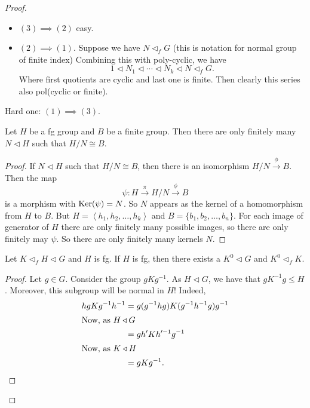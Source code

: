 \begin{proof}
    \begin{itemize}
        \item $(3) \implies (2)$ easy.

        \item $(2) \implies (1)$.
            Suppose we have $N \triangleleft_f G$ (this is notation for normal group of finite index)
            Combining this with poly-cyclic, we have
            \[
            1 \triangleleft N_1 \triangleleft \cdots \triangleleft N_k \triangleleft N \triangleleft_f G
            .\] 
            Where first quotients are cyclic and last one is finite.
            Then clearly this series also pol(cyclic or finite).
    \end{itemize}

    Hard one: $(1) \implies (3)$.
    \begin{lemma}
        Let $H$ be a fg group and $B$ be a finite group.
        Then there are only finitely many $N \triangleleft H$ such that $H / N \cong B$.
    \end{lemma}
    \begin{proof}
        If $N\triangleleft H$ such that $H / N \cong B$, then there is an isomorphism  $H / N \xrightarrow{\phi} B$.
        Then the map
        \[
        \psi: H \xrightarrow{\pi}   H / N \xrightarrow{\phi} B
        \] 
        is a morphism with $\operatorname{Ker}(\psi) = N$.
        So $N$ appears as the kernel of a homomorphism from $H$ to $B$.
        But $ H = \left< h_1, h_2, \ldots, h_k\right>$ and $B = \{b_1, b_2, \ldots, b_n\}$.
        For each image of generator of $H$ there are only finitely many possible images, so there are only finitely may $\psi$.
        So there are only finitely many kernels $N$.
    \end{proof}
    \begin{lemma}
        Let $K \triangleleft_f H \triangleleft G$ and $H$ is fg.
        If $H$ is fg, then there exists a  $ K^0 \triangleleft G$ and $K^0 \triangleleft_f K$.
    \end{lemma}
    \begin{proof}
        Let $g \in G.$
        Consider the group $g K g^{-1}$.
        As $H \triangleleft G$, we have that $g K^{-1} g \le  H$.
        Moreover, this subgroup will be normal in $H$!
        Indeed, 
        \begin{align*}
            h g K g^{-1} h^{-1} &= g(g^{-1} h g) K (g^{-1} h^{-1} g) g^{-1}\\
            \shortintertext{Now, as $H \triangleleft G$}
                                &= g h' K h'^{-1}  g^{-1}\\
        \shortintertext{Now, as $K \triangleleft H$}
                                &= g K g ^{-1}
        .\end{align*} 


\end{proof}
\end{proof}

